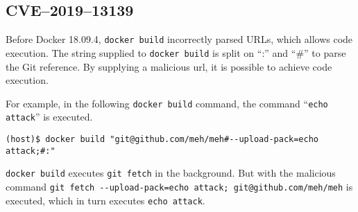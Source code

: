 \subsection{CVE--2019--13139}
Before Docker 18.09.4, \lstinline{docker build} incorrectly parsed URLs, which allows code execution\cite{CVE-2019-13139-STAALDRAAD}. The string supplied to \lstinline{docker build} is split on ``:'' and ``\#'' to parse the Git reference. By supplying a malicious url, it is possible to achieve code execution.

\medskip

For example, in the following \lstinline{docker build} command, the command ``\lstinline{echo attack}'' is executed.

\begin{lstlisting}[caption={\lstinline{docker build} command execution.},captionpos=b]
(host)$ docker build "git@github.com/meh/meh#--upload-pack=echo attack;#:"
\end{lstlisting}

\lstinline{docker build} executes \lstinline{git fetch} in the background. But with the malicious command \lstinline{git fetch --upload-pack=echo attack; git@github.com/meh/meh} is executed, which in turn executes \lstinline{echo attack}.
